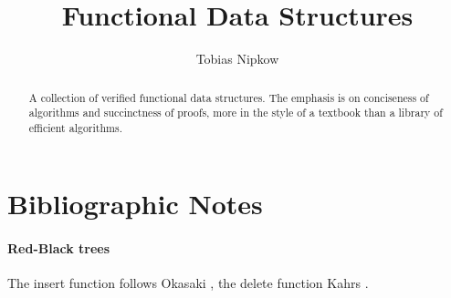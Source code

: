 \documentclass[11pt,a4paper]{article}
\begin{document}
\title{Functional Data Structures}
\author{Tobias Nipkow}
\maketitle

\begin{abstract}
A collection of verified functional data structures. The emphasis is on
conciseness of algorithms and succinctness of proofs, more in the style
of a textbook than a library of efficient algorithms.
\end{abstract}

\setcounter{tocdepth}{1}
\tableofcontents
\newpage



\section{Bibliographic Notes}

\paragraph{Red-Black trees}
The insert function follows Okasaki \cite{Okasaki}, the delete function
Kahrs \cite{Kahrs-html,Kahrs-JFP01}.



\end{document}
